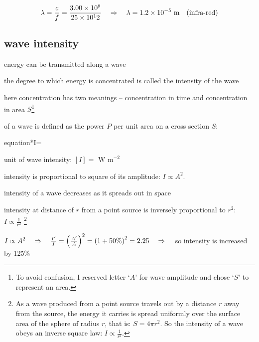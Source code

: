 \begin{soln}
    
\begin{equation*}
	\lambda = \frac{c}{f} = \frac{3.00\times10^8}{25\times10^12} \quad \Rightarrow \quad \lambda = 1.2 \times 10^{-5} \text{ m} \quad \text{(infra-red)} 
\end{equation*}
\end{soln}

	

\subsection{wave intensity}

energy can be transmitted along a wave

the degree to which energy is concentrated is called the intensity of the wave

here concentration has two meanings -- concentration in time and concentration in area $S$\footnote{To avoid confusion, I reserved letter `$A$' for wave amplitude and chose `$S$' to represent an area.}

\begin{ilight}
	\centering {} of a wave is defined as the power $P$ per unit area on a cross section $S$: \begin{empheq}[box=\tcbhighmath]{equation*}{I=}\end{empheq}
\end{ilight}

\cmt unit of wave intensity: $[I] = \text{ W m}^{-2}$

\cmt intensity is proportional to square of its amplitude: $\boxed{I \propto A^2}$.

\cmt intensity of a wave decreases as it spreads out in space

intensity at distance of $r$ from a point source is inversely proportional to $r^2$: $\boxed{I \propto \frac{1}{r^2}}$
\footnote{As a wave produced from a point source travels out by a distance $r$ away from the source, the energy it carries is spread uniformly over the surface area of the sphere of radius $r$, that is: $S=4\pi r^2$. So the intensity of a wave obeys an inverse square law: $I \propto \frac{1}{r^2}$.}


\begin{soln} $I \propto A^2 \quad \Rightarrow \quad \frac{I'}{I} = \left( \frac{A'}{A} \right)^2 = \left( 1 + 50\% \right)^2 =2.25 \quad \Rightarrow \quad $ so intensity is increased by 125\% \end{soln}

